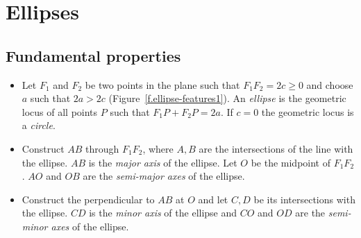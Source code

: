 

\section{Ellipses}\label{s.ellipse}

\subsection{Fundamental properties}

\begin{definition}[Ellipse]
\mbox{}
\begin{itemize}
\item Let $F_1$ and $F_2$ be two points in the plane such that $F_1F_2=2c\geq 0$ and choose $a$ such that $2a> 2c$ (Figure~\ref{f.ellipse-features1}). An \emph{ellipse} is the geometric locus of all points $P$ such that $F_1P+F_2P=2a$. If $c=0$ the geometric locus is a \emph{circle}.
\item Construct $AB$ through $F_1F_2$, where $A,B$ are the intersections of the line with the ellipse. $AB$ is  the \emph{major axis} of the ellipse. Let $O$ be the midpoint of $F_1F_2$. $AO$ and $OB$ are the \emph{semi-major axes} of the ellipse.
\item Construct the perpendicular to $AB$ at $O$ and let $C,D$ be its intersections with the ellipse. $CD$ is the \emph{minor axis} of the ellipse and $CO$ and $OD$ are the \emph{semi-minor axes} of the ellipse.
\end{itemize}
\end{definition}

\vspace{-3ex}


